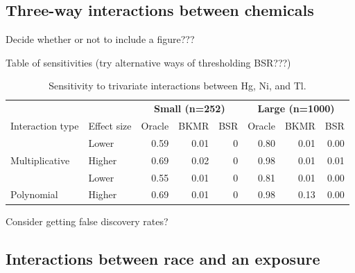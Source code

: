 \documentclass[12pt, twoside]{amherstthesis}
\begin{document}
\hypertarget{three-way-interactions-between-chemicals}{%
\subsection{Three-way interactions between chemicals}\label{three-way-interactions-between-chemicals}}

Decide whether or not to include a figure???

Table of sensitivities (try alternative ways of thresholding BSR???)
\begin{table}

\caption{\label{tab:threewaysens}Sensitivity to trivariate interactions between Hg, Ni, and Tl.}
\centering
\begin{tabular}[t]{llrrrrrr}
\toprule
\multicolumn{2}{c}{\textbf{ }} & \multicolumn{3}{c}{\textbf{Small (n=252)}} & \multicolumn{3}{c}{\textbf{Large (n=1000)}} \\
\cmidrule(l{3pt}r{3pt}){3-5} \cmidrule(l{3pt}r{3pt}){6-8}
Interaction type & Effect size & Oracle & BKMR & BSR & Oracle & BKMR & BSR\\
\midrule
 & Lower & 0.59 & 0.01 & 0 & 0.80 & 0.01 & 0.00\\

\multirow{-2}{*}{\raggedright\arraybackslash Multiplicative} & Higher & 0.69 & 0.02 & 0 & 0.98 & 0.01 & 0.01\\
\addlinespace
 & Lower & 0.55 & 0.01 & 0 & 0.81 & 0.01 & 0.00\\

\multirow{-2}{*}{\raggedright\arraybackslash Polynomial} & Higher & 0.69 & 0.01 & 0 & 0.98 & 0.13 & 0.00\\
\bottomrule
\end{tabular}
\end{table}
Consider getting false discovery rates?

\hypertarget{interactions-between-race-and-an-exposure}{%
\subsection{Interactions between race and an exposure}\label{interactions-between-race-and-an-exposure}}
\end{document}
